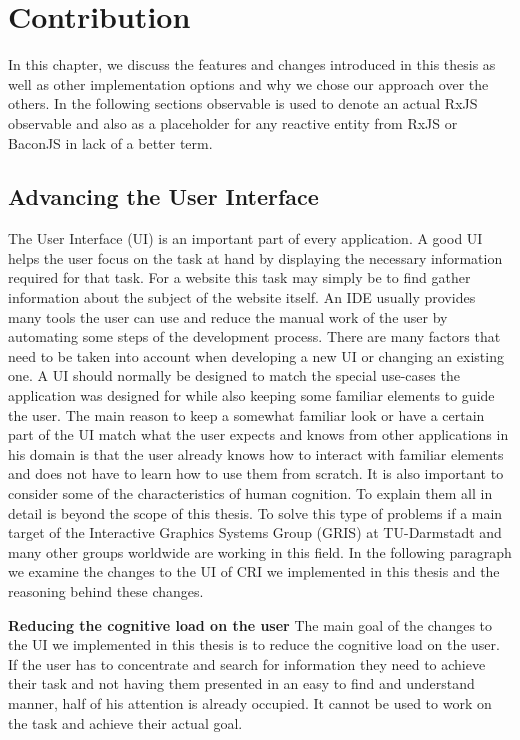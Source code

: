 \chapter{Contribution}
\label{ch:Contribution}
In this chapter, we discuss the features and changes introduced in this thesis as well as other implementation options and why we chose our approach over the others.
In the following sections observable is used to denote an actual RxJS observable and also as a placeholder for any reactive entity from RxJS or BaconJS in lack of a better term. %

\section{Advancing the User Interface}
The User Interface (UI) is an important part of every application. A good UI helps the user focus on the task at hand by displaying the necessary information required for that task. For a website this task may simply be to find gather information about the subject of the website itself. An IDE usually provides many tools the user can use and reduce the manual work of the user by automating some steps of the development process. There are many factors that need to be taken into account when developing a new UI or changing an existing one. A UI should normally be designed to match the special use-cases the application was designed for while also keeping some familiar elements to guide the user. The main reason to keep a somewhat familiar look or have a certain part of the UI match what the user expects and knows from other applications in his domain is that the user already knows how to interact with familiar elements and does not have to learn how to use them from scratch. It is also important to consider some of the characteristics of human cognition. To explain them all in detail is beyond the scope of this thesis. To solve this type of problems if a main target of the Interactive Graphics Systems Group (GRIS) at TU-Darmstadt and many other groups worldwide are working in this field. In the following paragraph we examine the changes to the UI of CRI we implemented in this thesis and the reasoning behind these changes.
  
\textbf{Reducing the cognitive load on the user}
The main goal of the changes to the UI we implemented in this thesis is to reduce the cognitive load on the user. If the user has to concentrate and search for information they need to achieve their task and not having them presented in an easy to find and understand manner, half of his attention is already occupied. It cannot be used to work on the task and achieve their actual goal.

